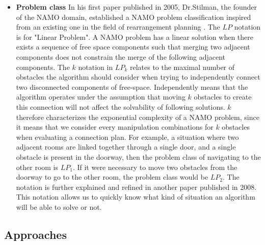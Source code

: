 \begin{itemize}
  \item \textbf{Problem class} In his first paper \parencite{stilman_navigation_2005} published in 2005, Dr.Stilman, the founder of the NAMO domain, established a NAMO problem classification inspired from an existing one in the field of rearrangement planning \parencite{ben-shahar_practical_1998}. The $LP$ notation is for "Linear Problem". A NAMO problem has a linear solution when there exists a sequence of free space components such that merging two adjacent components does not constrain the merge of the following adjacent components. The $k$ notation in $LP_k$ relates to the maximal number of obstacles the algorithm should consider when trying to independently connect two disconnected components of free-space. Independently means that the algorithm operates under the assumption that moving $k$ obstacles to create this connection will not affect the solvability of following solutions. $k$ therefore characterizes the exponential complexity of a NAMO problem, since it means that we consider every manipulation combinations for $k$ obstacles when evaluating a connection plan. For example, a situation where two adjacent rooms are linked together through a single door, and a single obstacle is present in the doorway, then the problem class of navigating to the other room is $LP_1$. If it were necessary to move two obstacles from the doorway to go to the other room, the problem class would be $LP_2$. The notation is further explained and refined in another paper \parencite{stilman_planning_2008} published in 2008. This notation allows us to quickly know what kind of situation an algorithm will be able to solve or not.
\end{itemize}

\subsection{Approaches}

